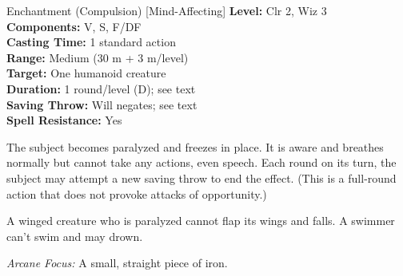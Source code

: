 {Enchantment (Compulsion) [Mind-Affecting]}
{
	\textbf{Level:}
	Clr 2, Wiz 3\\
	\textbf{Components:}
	V, S, F/DF\\
	\textbf{Casting Time:}
	1 standard action\\
	\textbf{Range:}
	Medium (30 m + 3 m/level)\\
	\textbf{Target:}
	One humanoid creature\\
	\textbf{Duration:}
	1 round/level (D); see text\\
	\textbf{Saving Throw:}
	Will negates; see text\\
	\textbf{Spell Resistance:}
	Yes\\
}
{
	The subject becomes paralyzed and freezes in place. It is aware and breathes normally but cannot take any actions, even speech. Each round on its turn, the subject may attempt a new saving throw to end the effect. (This is a full-round action that does not provoke attacks of opportunity.)

	A winged creature who is paralyzed cannot flap its wings and falls. A swimmer can't swim and may drown.

	\textit{Arcane Focus:}
	A small, straight piece of iron.

}
